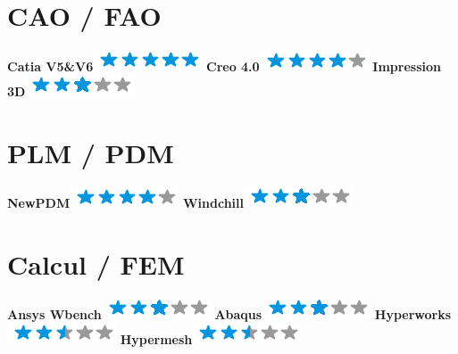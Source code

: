 \documentclass[]{friggeri-cv}
\begin{document}
\begin{aside}
\section{CAO / FAO}
\textbf{Catia V5\&V6}\includegraphics[scale=0.40]{res/img/5stars.png}
\textbf{Creo 4.0}\includegraphics[scale=0.40]{res/img/4stars.png}
\textbf{Impression 3D}\includegraphics[scale=0.40]{res/img/3stars.png}\section{PLM / PDM}
\textbf{NewPDM}\includegraphics[scale=0.40]{res/img/4stars.png}
\textbf{Windchill}\includegraphics[scale=0.40]{res/img/3stars.png}\section{Calcul / FEM}
\textbf{Ansys Wbench}\includegraphics[scale=0.40]{res/img/3stars.png}
\textbf{Abaqus}\includegraphics[scale=0.40]{res/img/3stars.png}
\textbf{Hyperworks}\includegraphics[scale=0.40]{res/img/2-5stars.png}
\textbf{Hypermesh}\includegraphics[scale=0.40]{res/img/2-5stars.png}
\end{aside}
\end{document}
